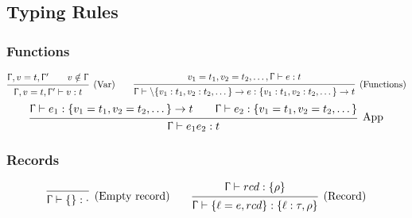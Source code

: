 \documentclass{article}
\newcommand{\arrow}{\to}
\newcommand{\rcd}[1]{\{#1\}}
\newcommand{\emptyrow}{\cdot}
\newcommand{\spc}{\qquad}
\newcommand{\ctx}{\Upgamma}
\newcommand{\derives}[3]{#1 \vdash #2 : #3}
\newcommand{\deduct}[3][]
{
  \begin{prooftree}
    \hypo{#2}
    \infer1[\text{#1}]{#3}
  \end{prooftree}
}
\begin{document}
\subsection{Typing Rules}

\subsubsection{Functions}
\[
  \deduct
  {\ctx, v = t, \ctx' \spc v \notin \ctx}
  {\derives {\ctx, v = t, \ctx'} v t}
  {\text{(Var)}}
  \spc
  \deduct
  {\derives {v_1=t_1,v_2=t_2,\dots,\ctx} e t}
  {\derives \ctx {\backslash \rcd{v_1: t_1, v_2 : t_2, \dots} \arrow e} { \rcd{v_1: t_1, v_2 : t_2, \dots}
      \arrow t}}
  {\text{(Functions)}}
\]
\[
  \deduct
  {\derives \ctx {e_1} {\rcd{v_1=t_1,v_2=t_2,\dots} \arrow t} \spc \derives \ctx
    {e_2} {\rcd{v_1=t_1,v_2=t_2,\dots}}}
  {\derives \ctx {e_1 e_2} t}
  {\text{App}}
\]

\subsubsection{Records}
\[
  \deduct
  {}
  {\derives \ctx {\rcd{}} \emptyrow}
  {\text{(Empty record)}}
  \spc
  \deduct
  {\derives \ctx {rcd} {\rcd \rho}}
  {\derives \ctx {\rcd{\ell=e,rcd}} {\rcd{\ell : \tau, \rho}}}
  {\text{(Record)}}
\]
\end{document}
